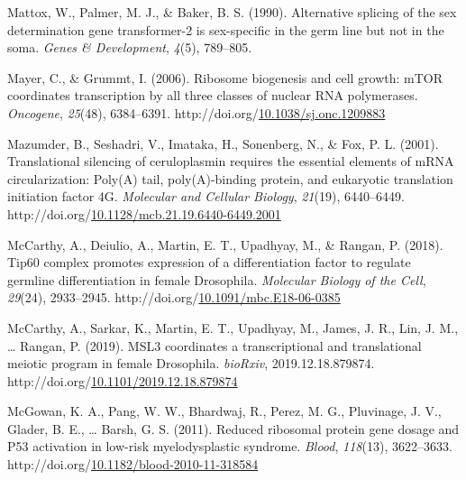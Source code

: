 \documentclass[12pt,oneside]{reedthesis}
\newlength{\cslhangindent}
\newenvironment{CSLReferences}[2] %
 {%
  \setlength{\parindent}{0pt}
  \ifodd #1 \everypar{\setlength{\hangindent}{\cslhangindent}}\ignorespaces\fi
  \ifnum #2 > 0
  \setlength{\parskip}{#2\baselineskip}
  \fi
 }%
 {}
\begin{document}
\begin{CSLReferences}{1}{0}
\leavevmode{}%
Mattox, W., Palmer, M. J., \& Baker, B. S. (1990). Alternative splicing of the sex determination gene transformer-2 is sex-specific in the germ line but not in the soma. \emph{Genes \& Development}, \emph{4}(5), 789--805.

\leavevmode{}%
Mayer, C., \& Grummt, I. (2006). Ribosome biogenesis and cell growth: {mTOR} coordinates transcription by all three classes of nuclear {RNA} polymerases. \emph{Oncogene}, \emph{25}(48), 6384--6391. http://doi.org/\href{https://doi.org/10.1038/sj.onc.1209883}{10.1038/sj.onc.1209883}

\leavevmode{}%
Mazumder, B., Seshadri, V., Imataka, H., Sonenberg, N., \& Fox, P. L. (2001). Translational silencing of ceruloplasmin requires the essential elements of {mRNA} circularization: Poly({A}) tail, poly({A})-binding protein, and eukaryotic translation initiation factor {4G}. \emph{Molecular and Cellular Biology}, \emph{21}(19), 6440--6449. http://doi.org/\href{https://doi.org/10.1128/mcb.21.19.6440-6449.2001}{10.1128/mcb.21.19.6440-6449.2001}

\leavevmode{}%
McCarthy, A., Deiulio, A., Martin, E. T., Upadhyay, M., \& Rangan, P. (2018). Tip60 complex promotes expression of a differentiation factor to regulate germline differentiation in female {Drosophila}. \emph{Molecular Biology of the Cell}, \emph{29}(24), 2933--2945. http://doi.org/\href{https://doi.org/10.1091/mbc.E18-06-0385}{10.1091/mbc.E18-06-0385}

\leavevmode{}%
McCarthy, A., Sarkar, K., Martin, E. T., Upadhyay, M., James, J. R., Lin, J. M., \ldots{} Rangan, P. (2019). {MSL3} coordinates a transcriptional and translational meiotic program in female {Drosophila}. \emph{bioRxiv}, 2019.12.18.879874. http://doi.org/\href{https://doi.org/10.1101/2019.12.18.879874}{10.1101/2019.12.18.879874}

\leavevmode{}%
McGowan, K. A., Pang, W. W., Bhardwaj, R., Perez, M. G., Pluvinage, J. V., Glader, B. E., \ldots{} Barsh, G. S. (2011). Reduced ribosomal protein gene dosage and P53 activation in low-risk myelodysplastic syndrome. \emph{Blood}, \emph{118}(13), 3622--3633. http://doi.org/\href{https://doi.org/10.1182/blood-2010-11-318584}{10.1182/blood-2010-11-318584}


\end{CSLReferences}
\end{document}
